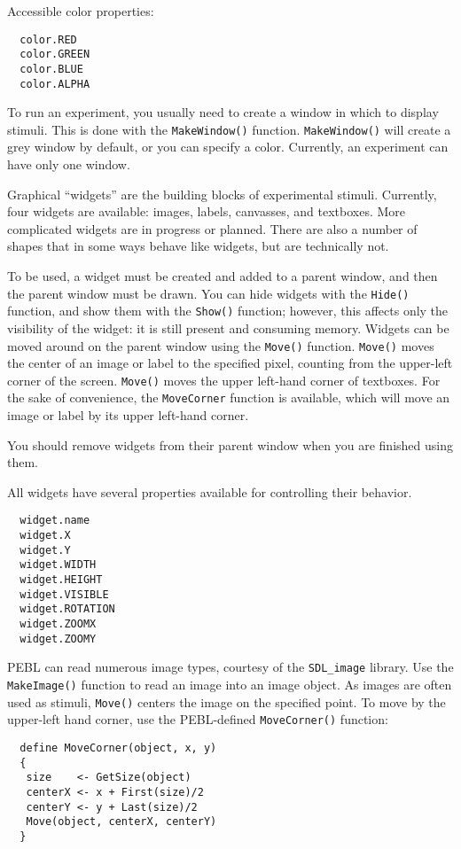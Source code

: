 Accessible color properties:
\begin{verbatim}
  color.RED
  color.GREEN
  color.BLUE
  color.ALPHA
\end{verbatim}
 


To run an experiment, you usually need to create a window in which 
to display stimuli.  This is done with the \texttt{MakeWindow()} function. \texttt{MakeWindow()} will create a grey window by default, or you can 
specify a color.  Currently, an experiment can have only one window.



Graphical ``widgets'' are the building blocks of experimental stimuli. 
Currently, four widgets are available: images, labels, canvasses, and textboxes.  
More complicated widgets are in progress or planned.  There are also a number of shapes that in some ways behave like widgets, but are technically not.

To be used, a widget must be created and added to a parent window, and
then the parent window must be drawn.  You can hide widgets with the
\texttt{Hide()} function, and show them with the \texttt{Show()}
function; however, this affects only the visibility of the widget: it
is still present and consuming memory. Widgets can be moved around on
the parent window using the \texttt{Move()} function. \texttt{Move()}
moves the center of an image or label to the specified pixel, counting
from the upper-left corner of the screen. \texttt{Move()} moves the
upper left-hand corner of textboxes.  For the sake of convenience, the
\texttt{MoveCorner} function is available, which will move an image or
label by its upper left-hand corner.

You should remove widgets from their parent window when you are
finished using them.

All widgets have several properties available for controlling their
behavior.
\begin{verbatim}
  widget.name
  widget.X
  widget.Y
  widget.WIDTH
  widget.HEIGHT
  widget.VISIBLE
  widget.ROTATION
  widget.ZOOMX
  widget.ZOOMY
\end{verbatim}


  


PEBL can read numerous image types, courtesy of the
\texttt{SDL\_image} library.  Use the \texttt{MakeImage()} function to
read an image into an image object.  As images are often used as
stimuli, \texttt{Move()} centers the image on the specified point.  To
move by the upper-left hand corner, use the PEBL-defined
\texttt{MoveCorner()} function:
\begin{verbatim}
  define MoveCorner(object, x, y)
  {
   size    <- GetSize(object)
   centerX <- x + First(size)/2
   centerY <- y + Last(size)/2
   Move(object, centerX, centerY)
  }
\end{verbatim}

